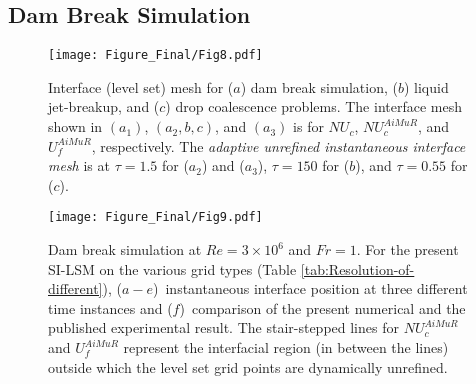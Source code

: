 \documentclass[preprint,12pt]{elsarticle}
\begin{document}
\subsection{Dam Break Simulation}\label{sub:Dam-Break-Simulation}


\begin{figure}
\begin{centering}

\par\end{centering}

\begin{centering}
\texttt{[image: Figure\_Final/Fig8.pdf]}
\par\end{centering}

\protect\caption{\label{fig:Mesh-distribution-for} Interface (level set) mesh
for ($a$) dam break simulation, ($b$) liquid jet-breakup, and ($c$) drop coalescence
problems. The interface mesh shown in $(a_1)$, $(a_2,b,c)$, and $(a_3)$ is for $NU_{c}$, $NU_{c}^{AiMuR}$, and $U_{f}^{AiMuR}$, respectively. The \textit{adaptive unrefined instantaneous interface mesh} is at $\tau=1.5$ for ($a_2$) and ($a_3$), $\tau=150$ for ($b$), and $\tau=0.55$ for ($c$).}

\end{figure}



\begin{figure}%
\begin{centering}

\par\end{centering}

\begin{centering}
\texttt{[image: Figure\_Final/Fig9.pdf]}
\par\end{centering}




\protect\caption{\label{fig:Qualitative-and-quantitative}Dam break simulation at $Re=3 \times 10^6$ and $Fr=1$. For the present SI-LSM on the various grid types (Table \ref{tab:Resolution-of-different}), ($a-e$)~instantaneous interface position  at three different time instances and ($f$)~comparison of the present numerical and the published experimental \cite{martin1952} result. The stair-stepped lines for $NU_{c}^{AiMuR}$ and $U_{f}^{AiMuR}$ represent the interfacial region (in between the lines) outside which the level set grid points are dynamically unrefined.}
\end{figure}
\end{document}
